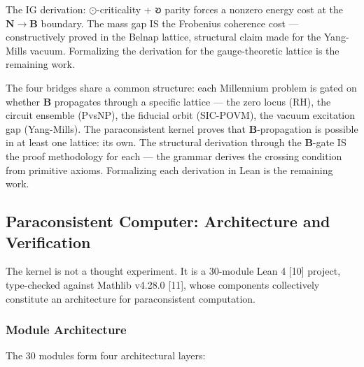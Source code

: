 \documentclass[10pt,a4paper]{article}
\begin{document}
The IG derivation: $\odot$-criticality + 𐑹 parity forces a nonzero energy cost at the $\mathbf{N} \to \mathbf{B}$ boundary. The mass gap IS the Frobenius coherence cost --- constructively proved in the Belnap lattice, structural claim made for the Yang-Mills vacuum. Formalizing the derivation for the gauge-theoretic lattice is the remaining work.

The four bridges share a common structure: each Millennium problem is gated on whether $\mathbf{B}$ propagates through a specific lattice --- the zero locus (RH), the circuit ensemble (PvsNP), the fiducial orbit (SIC-POVM), the vacuum excitation gap (Yang-Mills). The paraconsistent kernel proves that $\mathbf{B}$-propagation is possible in at least one lattice: its own. The structural derivation through the $\mathbf{B}$-gate IS the proof methodology for each --- the grammar derives the crossing condition from primitive axioms. Formalizing each derivation in Lean is the remaining work.

\subsection{Paraconsistent Computer: Architecture and Verification}

The kernel is not a thought experiment. It is a 30-module Lean 4 {[}10{]} project, type-checked against Mathlib v4.28.0 {[}11{]}, whose components collectively constitute an architecture for paraconsistent computation.

\subsubsection{Module Architecture}

The 30 modules form four architectural layers:
\end{document}
